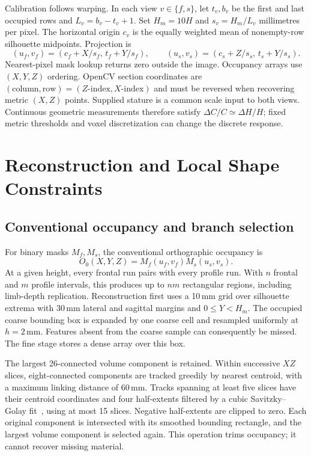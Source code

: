 \documentclass[11pt,a4paper]{article}
\begin{document}
Calibration follows warping. In each view $v\in\{f,s\}$, let $t_v,b_v$ be the first and last occupied rows and $L_v=b_v-t_v+1$. Set $H_m=10H$ and $s_v=H_m/L_v$ millimetres per pixel. The horizontal origin $c_v$ is the equally weighted mean of nonempty-row silhouette midpoints. Projection is
\begin{equation}
 (u_f,v_f)=(c_f+X/s_f,\,t_f+Y/s_f),\qquad
 (u_s,v_s)=(c_s+Z/s_s,\,t_s+Y/s_s).
 \label{eq:projection}
\end{equation}
Nearest-pixel mask lookup returns zero outside the image. Occupancy arrays use $(X,Y,Z)$ ordering. OpenCV section coordinates are $(\text{column},\text{row})=(Z\text{-index},X\text{-index})$ and must be reversed when recovering metric $(X,Z)$ points. Supplied stature is a common scale input to both views. Continuous geometric measurements therefore satisfy $\Delta C/C\simeq\Delta H/H$; fixed metric thresholds and voxel discretization can change the discrete response.

\section{Reconstruction and Local Shape Constraints}
\subsection{Conventional occupancy and branch selection}
For binary masks $M_f,M_s$, the conventional orthographic occupancy is
\begin{equation}
 O_0(X,Y,Z)=M_f(u_f,v_f)M_s(u_s,v_s).
 \label{eq:hull}
\end{equation}
At a given height, every frontal run pairs with every profile run. With $n$ frontal and $m$ profile intervals, this produces up to $nm$ rectangular regions, including limb-depth replication. Reconstruction first uses a 10\,mm grid over silhouette extrema with 30\,mm lateral and sagittal margins and $0\leq Y<H_m$. The occupied coarse bounding box is expanded by one coarse cell and resampled uniformly at $h=2$\,mm. Features absent from the coarse sample can consequently be missed. The fine stage stores a dense array over this box.

The largest 26-connected volume component is retained. Within successive $XZ$ slices, eight-connected components are tracked greedily by nearest centroid, with a maximum linking distance of 60\,mm. Tracks spanning at least five slices have their centroid coordinates and four half-extents filtered by a cubic Savitzky--Golay fit~\cite{savitzky1964smoothing}, using at most 15 slices. Negative half-extents are clipped to zero. Each original component is intersected with its smoothed bounding rectangle, and the largest volume component is selected again. This operation trims occupancy; it cannot recover missing material.
\end{document}
